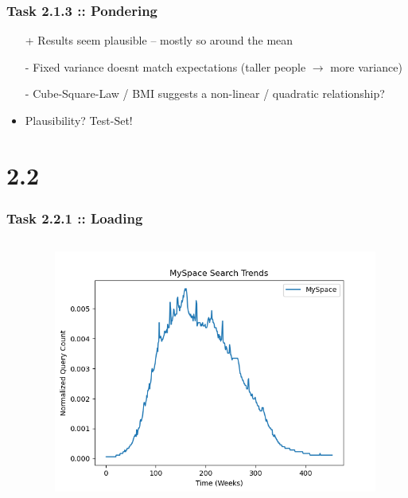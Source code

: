 \documentclass[10pt,aspectratio=169,handout]{beamer}
\begin{document}
\begin{frame}
    \frametitle{Task 2.1.3 :: Pondering}

    \begin{itemize}
        \item[+] Results seem plausible -- mostly so around the mean
        \item[-] Fixed variance doesnt match expectations (taller people $\rightarrow$ more variance)
        \item[-] Cube-Square-Law / BMI suggests a non-linear / quadratic relationship?
        \item    Plausibility? Test-Set!
    \end{itemize}
\end{frame}

\section{2.2}
\begin{frame}
    \frametitle{Task 2.2.1 :: Loading}
    \begin{columns}
    \begin{column}{0.6\textwidth}
        \inputminted[bgcolor=LightGray,fontsize=\small]{python}{code/myspace-pre.py}
    \end{column}
    \begin{column}{0.4\textwidth}
        \begin{figure}
            \includegraphics[width=\textwidth]{images/myspace.png}
        \end{figure}
    \end{column}
    \end{columns}
\end{frame}
\end{document}
